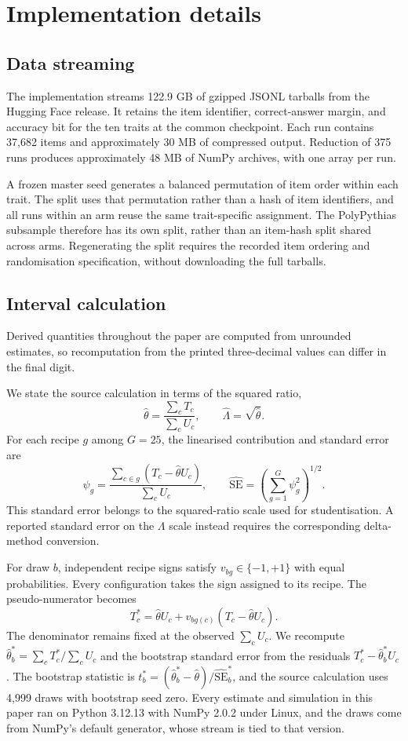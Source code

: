 \section{Implementation details}
\label{app:implementation}

\subsection{Data streaming}
The implementation streams 122.9 GB of gzipped JSONL tarballs from the Hugging Face release. It retains the item identifier, correct-answer margin, and accuracy bit for the ten traits at the common checkpoint. Each run contains 37,682 items and approximately 30 MB of compressed output. Reduction of 375 runs produces approximately 48 MB of NumPy archives, with one array per run.

A frozen master seed generates a balanced permutation of item order within each trait. The split uses that permutation rather than a hash of item identifiers, and all runs within an arm reuse the same trait-specific assignment. The PolyPythias subsample therefore has its own split, rather than an item-hash split shared across arms. Regenerating the split requires the recorded item ordering and randomisation specification, without downloading the full tarballs.

\subsection{Interval calculation}
Derived quantities throughout the paper are computed from unrounded estimates, so recomputation from the printed three-decimal values can differ in the final digit.

We state the source calculation in terms of the squared ratio,
\[
\widehat\theta=\frac{\sum_cT_c}{\sum_cU_c},\qquad
\widehat\Lambda=\sqrt{\widehat\theta}.
\]
For each recipe $g$ among $G=25$, the linearised contribution and standard error are
\begin{equation}
\psi_g=\frac{\sum_{c\in g}(T_c-\widehat\theta U_c)}{\sum_cU_c},
\qquad
\widehat{\mathrm{SE}}=\left(\sum_{g=1}^{G}\psi_g^2\right)^{1/2}.
\label{eq:bootstrap}
\end{equation}
This standard error belongs to the squared-ratio scale used for studentisation. A reported standard error on the $\Lambda$ scale instead requires the corresponding delta-method conversion.

For draw $b$, independent recipe signs satisfy $v_{bg}\in\{-1,+1\}$ with equal probabilities. Every configuration takes the sign assigned to its recipe. The pseudo-numerator becomes
\[
T_c^*=\widehat\theta U_c+v_{bg(c)}(T_c-\widehat\theta U_c).
\]
The denominator remains fixed at the observed $\sum_cU_c$. We recompute $\widehat\theta_b^*=\sum_cT_c^*/\sum_cU_c$ and the bootstrap standard error from the residuals $T_c^*-\widehat\theta_b^*U_c$. The bootstrap statistic is $t_b^*=(\widehat\theta_b^*-\widehat\theta)/\widehat{\mathrm{SE}}_b^*$, and the source calculation uses 4,999 draws with bootstrap seed zero. Every estimate and simulation in this paper ran on Python 3.12.13 with NumPy 2.0.2 under Linux, and the draws come from NumPy's default generator, whose stream is tied to that version.

